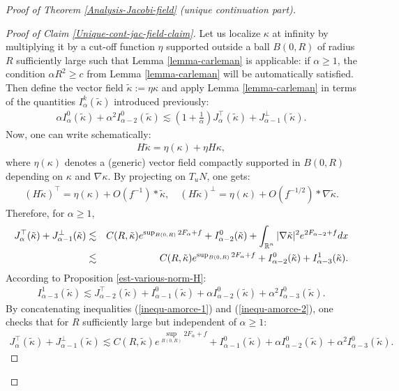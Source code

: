 \documentclass[a4paper,11pt,reqno]{amsart}
\def\R{\mathop{\rm \mathbb{R}}\nolimits}
\begin{document}
\begin{proof}[Proof of Theorem \ref{Analysis-Jacobi-field} (unique continuation part)]
\begin{proof}[Proof of Claim \ref{Unique-cont-jac-field-claim}]
Let us localize $\kappa$ at infinity by multiplying it by a cut-off function $\eta$ supported outside a ball $B(0,R)$ of radius $R$ sufficiently large such that Lemma \ref{lemma-carleman} is applicable: if $\alpha\geq 1$, the condition $\alpha R^2\geq c$ from Lemma \ref{lemma-carleman}  will be automatically satisfied. Then define the vector field $\tilde{\kappa}:=\eta\kappa$ and apply Lemma \ref{lemma-carleman} in terms of the quantities $I^{k}_{\alpha}(\tilde{\kappa})$ introduced previously:
\begin{eqnarray}
\alpha I^{0}_{\alpha}(\tilde{\kappa})+\alpha^2I^0_{\alpha-2}(\tilde{\kappa})\lesssim \left(1+\frac{1}{\alpha}\right)J^{\top}_{\alpha}(\tilde{\kappa})+J^{\perp}_{\alpha-1}(\tilde{\kappa}).\label{inequ-carleman-2}
\end{eqnarray}
Now, one can write schematically:
\begin{eqnarray*}
H\tilde{\kappa}=\eta(\kappa)+\eta H\kappa,
\end{eqnarray*}
where $\eta(\kappa)$ denotes a (generic) vector field compactly supported in $B(0,R)$ depending on $\kappa$ and $\nabla \kappa$. By projecting on $T_uN$, one gets:
\begin{eqnarray*}
(H\tilde{\kappa})^{\top}=\eta(\kappa)+\textit{O}(f^{-1})\ast \tilde{\kappa},\quad (H\tilde{\kappa})^{\perp}=\eta(\kappa)+\textit{O}(f^{-1/2})\ast\nabla\tilde{\kappa}.
\end{eqnarray*}
Therefore, for $\alpha\geq 1$, 
\begin{eqnarray}
J^{\top}_{\alpha}(\tilde{\kappa})+J^{\perp}_{\alpha-1}(\tilde{\kappa})&\lesssim& C(R,\tilde{\kappa})e^{\sup_{B(0,R)}2F_{\alpha}+f}+I^0_{\alpha-2}(\tilde{\kappa})+\int_{\R^n}|\nabla \tilde{\kappa}|^2e^{2F_{\alpha-2}+f}dx\\
&\lesssim&C(R,\tilde{\kappa})e^{\sup_{B(0,R)}2F_{\alpha}+f}+I^0_{\alpha-2}(\tilde{\kappa})+I^1_{\alpha-3}(\tilde{\kappa}).\label{inequ-amorce-1}
\end{eqnarray}
According to Proposition \ref{est-various-norm-H}:
\begin{eqnarray}
I^1_{\alpha-3}(\tilde{\kappa})\lesssim J^{\top}_{\alpha-2}(\tilde{\kappa})+I^0_{\alpha-1}(\tilde{\kappa})+\alpha I^0_{\alpha-2}(\tilde{\kappa})+\alpha^2 I^0_{\alpha-3}(\tilde{\kappa}).\label{inequ-amorce-2}
\end{eqnarray}
 By concatenating inequalities (\ref{inequ-amorce-1}) and (\ref{inequ-amorce-2}), one checks that for $R$ sufficiently large but independent of $\alpha\geq 1$:
 \begin{eqnarray*}
J^{\top}_{\alpha}(\tilde{\kappa})+J^{\perp}_{\alpha-1}(\tilde{\kappa})\lesssim C(R,\tilde{\kappa})e^{\sup_{B(0,R)}2F_{\alpha}+f}+I^0_{\alpha-1}(\tilde{\kappa})+\alpha I^0_{\alpha-2}(\tilde{\kappa})+\alpha^2 I^0_{\alpha-3}(\tilde{\kappa}).

\end{eqnarray*}
\end{proof}
\end{proof}
\end{document}

